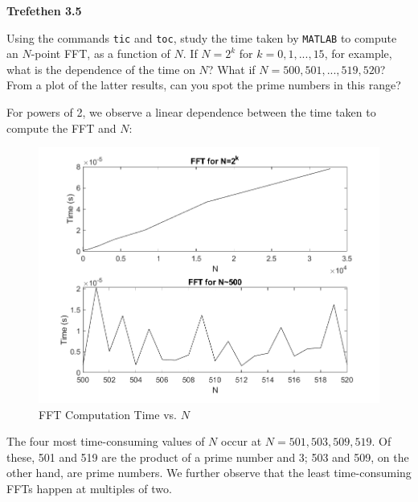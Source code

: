 \textbf{Trefethen 3.5}

Using the commands \texttt{tic} and \texttt{toc}, study the time taken by \texttt{MATLAB} to compute an $N$-point FFT,
as a function of $N$. If $N = 2^k$ for $k = 0, 1, ...,15$, for example, what is the dependence of the time on $N$? What
if $N = 500, 501, ..., 519, 520$? From a plot of the latter results, can you spot the prime numbers in this range?


\begin{solution}
  For powers of 2, we observe a linear dependence between the time taken to compute the FFT and $N$:

  \begin{figure}[h]
    \centering
    \includegraphics[width=\textwidth]{problem_6.png}
    \caption{FFT Computation Time vs. $N$}
  \end{figure}

  The four most time-consuming values of $N$ occur at $N = 501, 503, 509, 519$. Of these, 501 and 519 are the product of
  a prime number and 3; 503 and 509, on the other hand, are prime numbers. We further observe that the least 
  time-consuming FFTs happen at multiples of two.
  \ \\
\end{solution}